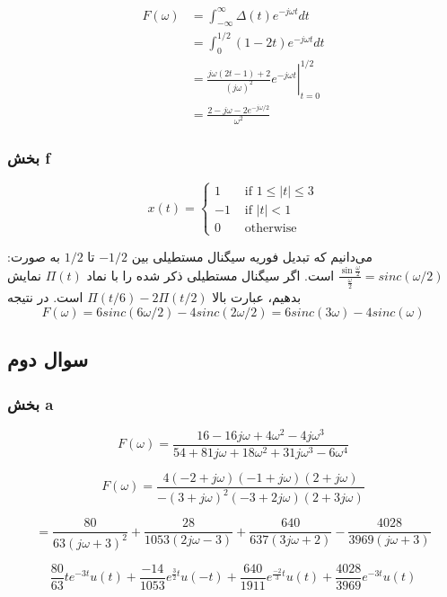 \documentclass[12pt]{article}
\begin{document}
$$
\begin{aligned}
	F(\omega) &=\int_{-\infty}^{\infty} \Delta(t) e^{-j \omega t} d t \\
	&=\int_{0}^{1 / 2}(1-2 t) e^{-j \omega t} d t \\
	&=\left.\frac{j \omega(2 t-1)+2}{(j \omega)^{2}} e^{-j \omega t}\right|_{t=0} ^{1 / 2} \\
	&=\frac{2-j \omega-2 e^{-j \omega / 2}}{\omega^{2}}
\end{aligned}
$$

\subsubsection{بخش f}

$$
x(t)=\left\{\begin{aligned}
	1 & \text { if } 1 \leq|t| \leq 3 \\
	-1 & \text { if }|t|<1 \\
	0 & \text { otherwise }
\end{aligned}\right.
$$

می‌دانیم که تبدیل فوریه سیگنال مستطیلی بین $-1/2$ تا $1/2$ به صورت:
$\frac{\sin \frac{\omega }{2}}{\frac{\omega}{2}} = sinc (\omega/2)$
است. اگر سیگنال مستطیلی ذکر شده را با نماد $\Pi(t)$ نمایش بدهیم، عبارت بالا
$\Pi(t/6) - 2\Pi (t/2)$
است. در نتیجه
$$F(\omega) = 6sinc(6 \omega/2) - 4 sinc(2 \omega /2) = 6sinc(3\omega) - 4 sinc(\omega)$$

\newpage

\subsection{سوال دوم}

\subsubsection{بخش a}

$$
F(\omega)=\frac{16-16 j \omega+4 \omega^{2}-4 j \omega^{3}}{54+81 j \omega+18 \omega^{2}+31 j \omega^{3}-6 \omega^{4}}
$$

$$F(\omega) = \frac{4 (-2 + j\omega) (-1 + j\omega) (2 + j\omega)}{-(3 + j\omega)^2 (-3 + 2 j\omega) (2 + 3 j\omega)}$$

$$= \frac{80}{63 (j\omega+3)^2}+\frac{28}{1053 (2 j\omega-3)}+\frac{640}{637 (3 j\omega+2)}-\frac{4028}{3969 (j\omega+3)}$$

$$\frac{80}{63} t e^{-3t} u(t) +\frac{-14}{1053}e^{\frac{3}{2}t}u(-t)+\frac{640}{1911}e^{\frac{-2}{3} t}u(t) + \frac{4028}{3969} e^{-3t}u(t) $$
\end{document}
